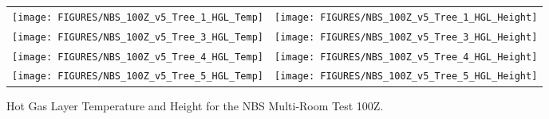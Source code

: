 \begin{figure}[p]
\begin{tabular*}{\textwidth}{l@{\extracolsep{\fill}}r}
\texttt{[image: FIGURES/NBS\_100Z\_v5\_Tree\_1\_HGL\_Temp]} &
\texttt{[image: FIGURES/NBS\_100Z\_v5\_Tree\_1\_HGL\_Height]} \\
\texttt{[image: FIGURES/NBS\_100Z\_v5\_Tree\_3\_HGL\_Temp]} &
\texttt{[image: FIGURES/NBS\_100Z\_v5\_Tree\_3\_HGL\_Height]} \\
\texttt{[image: FIGURES/NBS\_100Z\_v5\_Tree\_4\_HGL\_Temp]} &
\texttt{[image: FIGURES/NBS\_100Z\_v5\_Tree\_4\_HGL\_Height]} \\
\texttt{[image: FIGURES/NBS\_100Z\_v5\_Tree\_5\_HGL\_Temp]} &
\texttt{[image: FIGURES/NBS\_100Z\_v5\_Tree\_5\_HGL\_Height]}
\end{tabular*}
\caption{Hot Gas Layer Temperature and Height for the NBS Multi-Room Test 100Z.} \label{NBS_100Z_HGL}
\end{figure}

\clearpage
